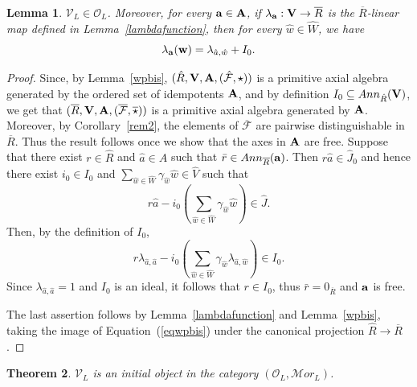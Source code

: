 \documentclass[a4paper]{amsart}
\newtheorem{lemma}{Lemma}[section]
\newtheorem{theorem}[lemma]{Theorem}
\newcommand{\Amo}{{\mathcal {\bf A}}}
\newcommand{\A}{ {\hat A}}
\newcommand{\Ro}{{\overline R}}
\newcommand{\Vo}{{\bf V}}
\newcommand{\aV}{{\hat V}}
\newcommand{\aR}{{\hat R}}
\newcommand{\hW}{{\hat W}}
\newcommand{\hJ}{{\hat J}}
\newcommand{\ha}{{\hat a}}
\newcommand{\hw}{{\hat w}}
\newcommand{\ba}{{\bf a}}
\newcommand{\bw}{{\bf w}}
\begin{document}
\begin{lemma}\label{free1}
$\mathcal V_L\in \mathcal O_L$. Moreover, for every $\ba \in \Amo$, if $\lambda_\ba:\Vo\to \Ro$ is the $\Ro$-linear map defined in Lemma~\ref{lambdafunction}, then for every $\hat w\in \hat W$, we have
\begin{equation}\label{lambdone}
\lambda_\ba(\bw)=\lambda_{\hat a, \hat w}+I_0.
\end{equation}
\end{lemma}
\begin{proof}
Since, by Lemma~\ref{wpbis}, $(\aR, \Vo, \Amo, (\hat {\mathcal F},\star))$ is a  primitive axial algebra generated by the ordered set of idempotents $\Amo$, and by definition $I_0\subseteq Ann_\aR(\Vo)$, we get that $(\Ro,\Vo, \Amo, (\overline {\mathcal F}, \overline \star))$ is a primitive axial algebra generated by $\Amo$. Moreover, by Corollary~\ref{rem2}, the elements of $\overline{\mathcal F}$ are pairwise distinguishable in $\Ro$. Thus the result follows once we show that the axes in $\Amo$ are free. Suppose that there exist $r\in \aR$ and $\ha \in \A$ such that $\bar r\in Ann_\Ro(\ba)$. Then $r\ha\in \hJ_0$ and hence there exist $i_0\in I_0$ and $\sum_{\hw\in \hW}\gamma_\hw \hw\in  \aV$ such that
$$
r\ha-i_0\left(\sum_{\hw\in \hW}\gamma_\hw \hw\right )\in \hJ.
$$
Then, by the definition of $I_0$,
$$
r\lambda_{\ha,\ha}-i_0\left(\sum_{\hw\in \hW}\gamma_\hw \lambda_{\ha,\hw}\right )\in I_0.
$$
Since $\lambda_{\ha,\ha}=1$ and $I_0$ is an ideal, it follows that $r \in I_0$, thus $\bar r=0_\Ro$ and $\ba$ is free.

The last assertion follows by Lemma~\ref{lambdafunction} and Lemma~\ref{wpbis}, taking the image of Equation~(\ref{eqwpbis}) under the canonical projection $\hat R\to \Ro$.
\end{proof}

\begin{theorem}\label{free}
$\mathcal V_L$ is an initial object in the category $({\mathcal O}_L,{\mathcal Mor}_L)$.
\end{theorem}
\end{document}
